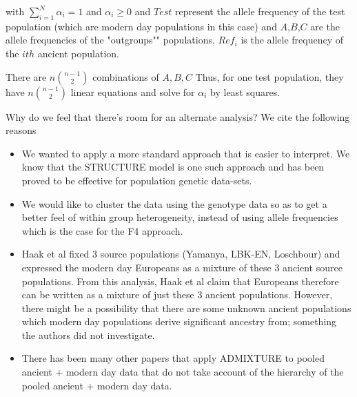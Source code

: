 \documentclass[11pt]{article}
\begin{document}
with $\sum_{i=1}^N \alpha_i = 1$ and $\alpha_i \geq 0$ and $Test$ represent the allele frequency of the test population (which are modern day populations in this case) and $A$,$B$,$C$ are the allele frequencies of the "outgroups"" populations. $Ref_i$ is the allele frequency of the $ith$ ancient population.

There are $n{n-1 \choose 2}$ combinations of $A,B,C$ Thus, for one test population, they have $n{n-1 \choose 2}$ linear equations and solve for $\alpha_i$ by least squares. 

Why do we feel that there's room for an alternate analysis? We cite the following reasons

\begin{itemize}

\item We wanted to apply a more standard approach that is easier to interpret. We know that the STRUCTURE model is one such approach and has been proved to be effective for population genetic data-sets. 

\item We would like to cluster the data using the genotype data so as to get a better feel of within group heterogeneity, instead of using  allele frequencies which is the case for the F4 approach. 

\item Haak et al fixed 3 source populations (Yamanya, LBK-EN, Loschbour) and expressed the modern day Europeans as a mixture of these 3 ancient source populations. From this analysis, Haak et al claim that Europeans therefore can be written as a mixture of just these 3 ancient populations. However, there might be a possibility that there are some unknown ancient populations which modern day populations derive significant ancestry from; something the authors did not investigate. 

\item There has been many other papers that apply ADMIXTURE to pooled ancient + modern day data that do not take account of the hierarchy of the pooled ancient + modern day data. 

\end{itemize}
\end{document}
